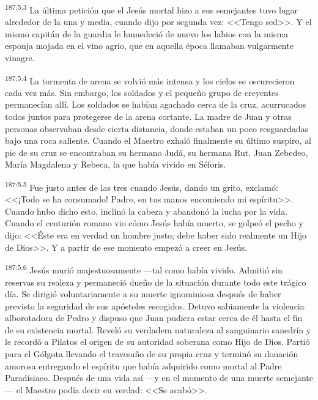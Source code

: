 \par 
\textsuperscript{187:5.3} La última petición que el Jesús mortal hizo a sus semejantes tuvo lugar alrededor de la una y media, cuando dijo por segunda vez: <<Tengo sed>>. Y el mismo capitán de la guardia le humedeció de nuevo los labios con la misma esponja mojada en el vino agrio, que en aquella época llamaban vulgarmente vinagre.

\par 
\textsuperscript{187:5.4} La tormenta de arena se volvió más intensa y los cielos se oscurecieron cada vez más. Sin embargo, los soldados y el pequeño grupo de creyentes permanecían allí. Los soldados se habían agachado cerca de la cruz, acurrucados todos juntos para protegerse de la arena cortante. La madre de Juan y otras personas observaban desde cierta distancia, donde estaban un poco resguardadas bajo una roca saliente. Cuando el Maestro exhaló finalmente su último suspiro, al pie de su cruz se encontraban su hermano Judá, su hermana Rut, Juan Zebedeo, María Magdalena y Rebeca, la que había vivido en Séforis.

\par 
\textsuperscript{187:5.5} Fue justo antes de las tres cuando Jesús, dando un grito, exclamó: <<¡Todo se ha consumado! Padre, en tus manos encomiendo mi espíritu>>. Cuando hubo dicho esto, inclinó la cabeza y abandonó la lucha por la vida. Cuando el centurión romano vio cómo Jesús había muerto, se golpeó el pecho y dijo: <<Éste era en verdad un hombre justo; debe haber sido realmente un Hijo de Dios>>. Y a partir de ese momento empezó a creer en Jesús.

\par 
\textsuperscript{187:5.6} Jesús murió majestuosamente ---tal como había vivido. Admitió sin reservas su realeza y permaneció dueño de la situación durante todo este trágico día. Se dirigió voluntariamente a su muerte ignominiosa después de haber previsto la seguridad de sus apóstoles escogidos. Detuvo sabiamente la violencia alborotadora de Pedro y dispuso que Juan pudiera estar cerca de él hasta el fin de su existencia mortal. Reveló su verdadera naturaleza al sanguinario sanedrín y le recordó a Pilatos el origen de su autoridad soberana como Hijo de Dios. Partió para el Gólgota llevando el travesaño de su propia cruz y terminó su donación amorosa entregando el espíritu que había adquirido como mortal al Padre Paradisiaco. Después de una vida así ---y en el momento de una muerte semejante--- el Maestro podía decir en verdad: <<Se acabó>>.

